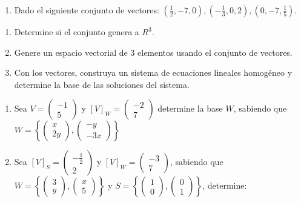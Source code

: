 \documentclass[
  11,
]{article}
\providecommand{\tightlist}{%
  \setlength{\itemsep}{0pt}\setlength{\parskip}{0pt}}
\begin{document}
\begin{enumerate}
\def\labelenumi{\arabic{enumi}.}
\setcounter{enumi}{5}
\tightlist
\item
  Dado el siguiente conjunto de vectores:
  \((\frac{1}{2},-7,0), (-\frac{1}{3},0,2),(0,-7,\frac{1}{5})\).
\end{enumerate}

\begin{enumerate}
\def\labelenumi{\alph{enumi})}
\tightlist
\item
  Determine si el conjunto genera a \(R^3\).
\item
  Genere un espacio vectorial de 3 elementos usando el conjunto de
  vectores.
\item
  Con los vectores, construya un sistema de ecuaciones lineales
  homogéneo y determine la base de las soluciones del sistema.
\end{enumerate}

\begin{enumerate}
\def\labelenumi{\arabic{enumi}.}
\setcounter{enumi}{6}
\item
  Sea \(V = \begin{pmatrix}-1\\5\end{pmatrix}\) y
  \([V]_W = \begin{pmatrix}-2\\7\end{pmatrix}\) determine la base \(W\),
  sabiendo que
  \(W = \left\{ \begin{pmatrix}x\\2y\end{pmatrix}, \begin{pmatrix}-y\\-3x\end{pmatrix} \right\}\)
\item
  Sea \([V]_S = \begin{pmatrix}-\frac{1}{2}\\2\end{pmatrix}\) y
  \([V]_W = \begin{pmatrix}-3\\7\end{pmatrix}\), sabiendo que
  \(W = \left\{ \begin{pmatrix}3\\y\end{pmatrix}, \begin{pmatrix}x\\5\end{pmatrix} \right\}\)
  y
  \(S = \left\{ \begin{pmatrix}1\\0\end{pmatrix}, \begin{pmatrix}0\\1\end{pmatrix} \right\}\),
  determine:
\end{enumerate}
\end{document}
